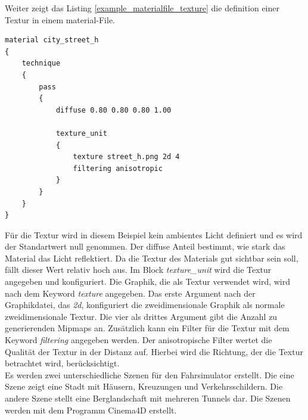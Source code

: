 Weiter zeigt das Listing \ref{example_materialfile_texture} die definition einer Textur in einem material-File.\\
\newpage
\begin{lstlisting}[caption={Beispiel aus dem material-File zur Beschreibung einer Textur},label={example_materialfile_texture}]
material city_street_h
{
	technique
	{
		pass
		{
			diffuse 0.80 0.80 0.80 1.00

			texture_unit
			{
				texture street_h.png 2d 4
				filtering anisotropic
			}
		}
	}
}
\end{lstlisting}
Für die Textur wird in diesem Beispiel kein ambientes Licht definiert und es wird der Standartwert null genommen. Der diffuse Anteil bestimmt, wie stark das Material das Licht reflektiert. Da die Textur des Materials gut sichtbar sein soll, fällt dieser Wert relativ hoch aus. Im Block \textit{texture\_unit} wird die Textur angegeben und konfiguriert. Die Graphik, die als Textur verwendet wird, wird nach dem Keyword \textit{texture} angegeben. Das erste Argument nach der Graphikdatei, das \textit{2d}, konfiguriert die zweidimensionale Graphik als normale zweidimensionale Textur. Die vier als drittes Argument gibt die Anzahl zu generierenden Mipmaps an. Zusätzlich kann ein Filter für die Textur mit dem Keyword \textit{filtering} angegeben werden. Der anisotropische Filter wertet die Qualität der Textur in der Distanz auf. Hierbei wird die Richtung, der die Textur betrachtet wird, berücksichtigt.\\
Es werden zwei unterschiedliche Szenen für den Fahrsimulator erstellt. Die eine Szene zeigt eine Stadt mit Häusern, Kreuzungen und Verkehrsschildern. Die andere Szene stellt eine Berglandschaft mit mehreren Tunnels dar. Die Szenen werden mit dem Programm Cinema4D erstellt. 
\newpage

